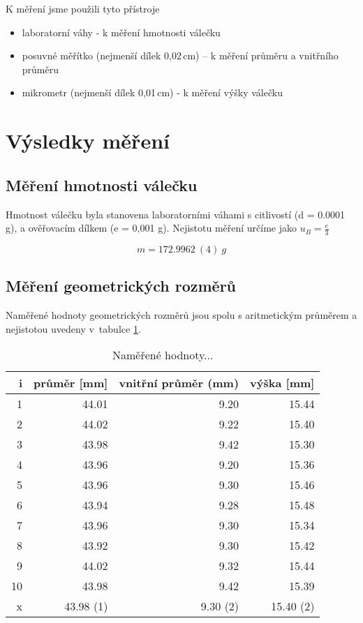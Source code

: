 \documentclass[a4paper,11pt]{article}
\begin{document}
K měření jsme použili tyto přístroje
\begin{itemize}
  \item laboratorní váhy - k měření hmotnosti válečku
    \item posuvné měřítko (nejmenší dílek 0,02\,cm) -- k měření průměru a vnitřního průměru
    \item mikrometr (nejmenší dílek 0,01\,cm) - k měření výšky válečku
\end{itemize}

\section{Výsledky měření}

\subsection{Měření hmotnosti válečku}
Hmotnost válečku byla stanovena laboratorními váhami s citlivostí (d = 0.0001 g), 
a ověřovacím dílkem (e = 0,001 g). Nejistotu měření určíme jako $u_B = \frac{e}{3}$

\begin{equation}
m = 172.9962\ (4)\ g
\end{equation}

\subsection{Měření geometrických rozměrů}
Naměřené hodnoty geometrických rozměrů jsou spolu s aritmetickým průměrem a nejistotou uvedeny v~tabulce \ref{tb:mer}.


\begin{table}[ht]
\centering

\begin{tabular}{| r | r | r | r |}
\hline
i & průměr [mm] & vnitřní průměr (mm) & výška [mm] \\
\hline\hline
1 & 44.01 & 9.20 & 15.44 \\
2 & 44.02 & 9.22 & 15.40 \\
3 & 43.98 & 9.42 & 15.30 \\
4 & 43.96 & 9.20 & 15.36 \\
5 & 43.96 & 9.30 & 15.46 \\
6 & 43.94 & 9.28 & 15.48 \\
7 & 43.96 & 9.30 & 15.34 \\
8 & 43.92 & 9.30 & 15.42 \\
9 & 44.02 & 9.32 & 15.44 \\
10 & 43.98 & 9.42 & 15.39 \\
\hline\hline
x & 43.98 (1) & 9.30 (2) & 15.40 (2) \\\hline

\end{tabular}
\caption{Naměřené hodnoty...}
\label{tb:mer}
\end{table}
\end{document}
